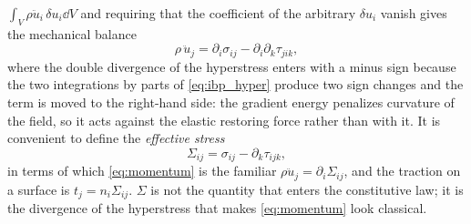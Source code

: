 $\int_V\rho\ddot u_i\,\delta u_i\dd V$ and requiring that the coefficient of the
arbitrary $\delta u_i$ vanish gives the mechanical balance
\begin{equation}
\label{eq:momentum}
\rho\,\ddot u_j=\partial_i\sigma_{ij}-\partial_i\partial_k\tau_{jik},
\end{equation}
where the double divergence of the hyperstress enters with a minus sign because
the two integrations by parts of \eqref{eq:ibp_hyper} produce two sign changes and
the term is moved to the right-hand side: the gradient energy penalizes
curvature of the field, so it acts against the elastic restoring force rather
than with it.  It is convenient to define the
\emph{effective stress}
\begin{equation}
\label{eq:effective}
\Sigma_{ij}=\sigma_{ij}-\partial_k\tau_{ijk},
\end{equation}
in terms of which \eqref{eq:momentum} is the familiar $\rho\ddot u_j=
\partial_i\Sigma_{ij}$, and the traction on a surface is $t_j=n_i\Sigma_{ij}$.
$\Sigma$ is not the quantity that enters the constitutive law; it is the
divergence of the hyperstress that makes \eqref{eq:momentum} look classical.

